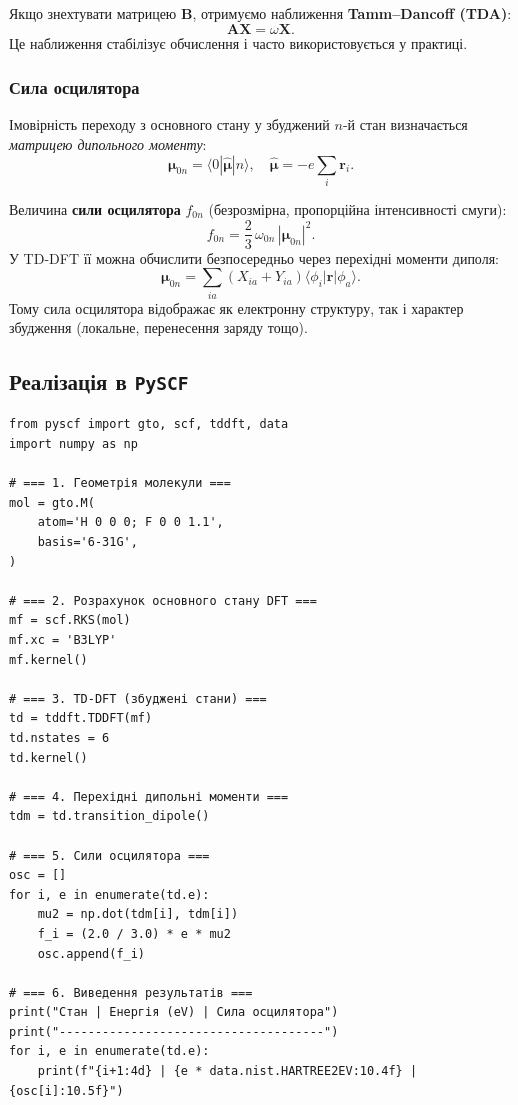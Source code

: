 Якщо знехтувати матрицею \(\mathbf{B}\), отримуємо наближення
\textbf{Tamm–Dancoff (TDA)}:
\[
    \mathbf{A}\mathbf{X} = \omega \mathbf{X}.
\]
Це наближення стабілізує обчислення і часто використовується у практиці.

\subsubsection{Сила осцилятора}

Імовірність переходу з основного стану у збуджений \(n\)-й стан
визначається \emph{матрицею дипольного моменту}:
\[
    \boldsymbol{\mu}_{0n} = \langle 0 | \hat{\boldsymbol{\mu}} | n \rangle,
    \quad
    \hat{\boldsymbol{\mu}} = -e\sum_i \mathbf{r}_i.
\]

Величина \textbf{сили осцилятора} \(f_{0n}\) (безрозмірна, пропорційна інтенсивності смуги):
\[
    f_{0n} = \frac{2}{3}\,\omega_{0n}\,|\boldsymbol{\mu}_{0n}|^2.
\]
У TD-DFT її можна обчислити безпосередньо через перехідні моменти диполя:
\[
    \boldsymbol{\mu}_{0n} = \sum_{ia} (X_{ia} + Y_{ia})
    \langle \phi_i | \mathbf{r} | \phi_a \rangle.
\]
Тому сила осцилятора відображає як електронну структуру, так і характер збудження
(локальне, перенесення заряду тощо).

\subsection{Реалізація в \texttt{PySCF}}

\begin{verbatim}
from pyscf import gto, scf, tddft, data
import numpy as np

# === 1. Геометрія молекули ===
mol = gto.M(
    atom='H 0 0 0; F 0 0 1.1',
    basis='6-31G',
)

# === 2. Розрахунок основного стану DFT ===
mf = scf.RKS(mol)
mf.xc = 'B3LYP'
mf.kernel()

# === 3. TD-DFT (збуджені стани) ===
td = tddft.TDDFT(mf)
td.nstates = 6
td.kernel()

# === 4. Перехідні дипольні моменти ===
tdm = td.transition_dipole()

# === 5. Сили осцилятора ===
osc = []
for i, e in enumerate(td.e):
    mu2 = np.dot(tdm[i], tdm[i])
    f_i = (2.0 / 3.0) * e * mu2
    osc.append(f_i)

# === 6. Виведення результатів ===
print("Стан | Енергія (eV) | Сила осцилятора")
print("-------------------------------------")
for i, e in enumerate(td.e):
    print(f"{i+1:4d} | {e * data.nist.HARTREE2EV:10.4f} | {osc[i]:10.5f}")

\end{verbatim}

